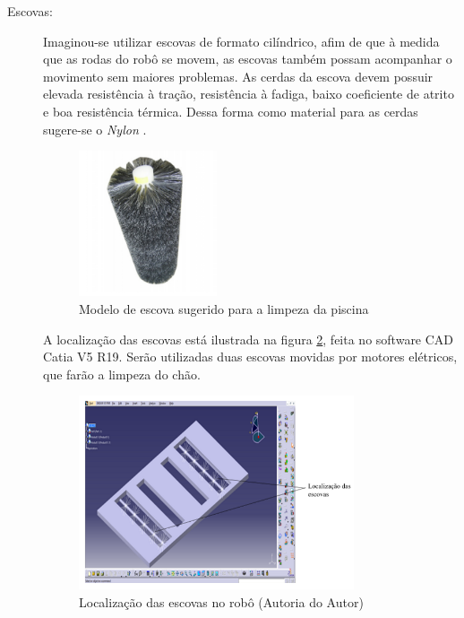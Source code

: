 \begin{description}
\item[Escovas:] Imaginou-se utilizar escovas de formato cilíndrico, afim de que
à medida que as rodas do robô se movem, as escovas também possam acompanhar o
movimento sem maiores problemas. As cerdas da escova devem possuir elevada
resistência à tração, resistência à fadiga, baixo coeficiente de atrito e boa
resistência térmica. Dessa forma como material para as cerdas sugere-se o
\textit{Nylon} \cite{santos2010}.
\par
\begin{figure}[h]
  \centering
  \includegraphics[width=0.4\textwidth]{figures/brush.png}
  \caption{Modelo de escova sugerido para a limpeza da piscina \cite{santaclara2016}}
  \label{fig:brush}
\end{figure}
\FloatBarrier
A localização das escovas está ilustrada na figura \ref{fig:brush-local}, feita no software
\textsf{CAD Catia V5 R19}. Serão utilizadas duas escovas movidas por motores elétricos,
que farão a limpeza do chão.
\par
\begin{figure}[h]
  \centering
  \includegraphics[width=0.8\textwidth]{figures/brush-local.png}
  \caption{Localização das escovas no robô (\textsf{Autoria do Autor})}
  \label{fig:brush-local}
\end{figure}

\end{description}
